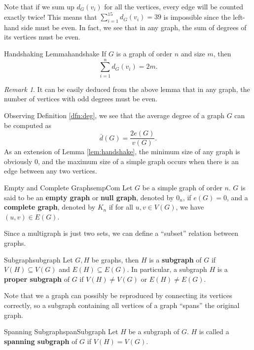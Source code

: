 \documentclass[math, code]{amznotes}
\theoremstyle{remark}
\newtheorem*{remark}{Remark}
\begin{document}
Note that if we sum up $d_G(v_i)$ for all the vertices, every edge will be counted exactly twice! This means that $\sum_{i = 1}^{15}d_G(v_i) = 39$ is impossible since the left-hand side must be even. In fact, we see that in any graph, the sum of degrees of its vertices must be even.
\begin{lembox}{Handshaking Lemma}{handshake}
    If $G$ is a graph of order $n$ and size $m$, then
    \begin{equation*}
        \sum_{i = 1}^{n}d_G(v_i) = 2m.
    \end{equation*}
\end{lembox}
\begin{notebox}
    \begin{remark}
        It can be easily deduced from the above lemma that in any graph, the number of vertices with odd degrees must be even.
    \end{remark}
\end{notebox}
Observing Definition \ref{dfn:deg}, we see that the average degree of a graph $G$ can be computed as
\begin{equation*}
    \bar{d}(G) = \frac{2e(G)}{v(G)}.
\end{equation*}
As an extension of Lemma \ref{lem:handshake}, the minimum size of any graph is obviously $0$, and the maximum size of a simple graph occurs when there is an edge between any two vertices.
\begin{dfnbox}{Empty and Complete Graphs}{empCom}
    Let $G$ be a simple graph of order $n$. $G$ is said to be an {\color{red} \textbf{empty graph}} or {\color{red} \textbf{null graph}}, denoted by $0_n$, if $e(G) = 0$, and a {\color{red} \textbf{complete graph}}, denoted by $K_n$ if for all $u, v \in V(G)$, we have $(u, v) \in E(G)$. 
\end{dfnbox}
Since a multigraph is just two sets, we can define a ``subset'' relation between graphs.
\begin{dfnbox}{Subgraph}{subgraph}
    Let $G, H$ be graphs, then $H$ is a {\color{red} \textbf{subgraph}} of $G$ if $V(H) \subseteq V(G)$ and $E(H) \subseteq E(G)$. In particular, a subgraph $H$ is a {\color{red} \textbf{proper subgraph}} of $G$ if $V(H) \neq V(G)$ or $E(H) \neq E(G)$.
\end{dfnbox}
Note that we a graph can possibly be reproduced by connecting its vertices correctly, so a subgraph containing all vertices of a graph ``spans'' the original graph.
\begin{dfnbox}{Spanning Subgraph}{spanSubgraph}
    Let $H$ be a subgraph of $G$. $H$ is called a {\color{red} \textbf{spanning subgraph}} of $G$ if $V(H) = V(G)$.
\end{dfnbox}
\end{document}
